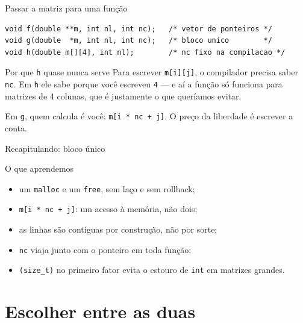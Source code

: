 \documentclass[aspectratio=169]{beamer}
\begin{document}
\begin{frame}[fragile]{Passar a matriz para uma função}
\begin{lstlisting}[basicstyle=\ttfamily\scriptsize, numbers=none]
void f(double **m, int nl, int nc);   /* vetor de ponteiros */
void g(double  *m, int nl, int nc);   /* bloco unico        */
void h(double m[][4], int nl);        /* nc fixo na compilacao */
\end{lstlisting}
  \begin{block}{Por que \texttt{h} quase nunca serve}
    Para escrever \texttt{m[i][j]}, o compilador precisa saber \texttt{nc}.
    Em \texttt{h} ele sabe porque você escreveu \texttt{4} --- e aí a função só
    funciona para matrizes de 4 colunas, que é justamente o que queríamos
    evitar.
  \end{block}
  \begin{exampleblock}{}
    \small Em \texttt{g}, quem calcula é você: \texttt{m[i * nc + j]}. O preço
    da liberdade é escrever a conta.
  \end{exampleblock}
\end{frame}

\begin{frame}{Recapitulando: bloco único}
  \begin{block}{O que aprendemos}
    \begin{itemize}
      \item um \texttt{malloc} e um \texttt{free}, sem laço e sem rollback;
      \item \texttt{m[i * nc + j]}: um acesso à memória, não dois;
      \item as linhas são contíguas por construção, não por sorte;
      \item \texttt{nc} viaja junto com o ponteiro em toda função;
      \item \texttt{(size\_t)} no primeiro fator evita o estouro de
        \texttt{int} em matrizes grandes.
    \end{itemize}
  \end{block}
\end{frame}

\section{Escolher entre as duas}
\end{document}
